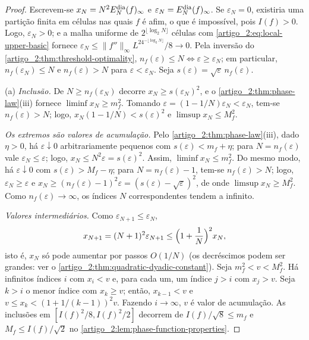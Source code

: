 \begin{proof}
Escrevem-se $x_N=N^2E_N^{\rm dia}(f)_\infty$ e $\varepsilon_N=E_N^{\rm dia}(f)_\infty$.
Se $\varepsilon_N=0$, existiria uma partição finita em células nas quais $f$ é afim,
o que é impossível, pois $I(f)>0$. Logo, $\varepsilon_N>0$; e a malha uniforme de $2^{\lfloor\log_2N\rfloor}$ células com
\eqref{artigo_2:eq:local-upper-basic} fornece
$\varepsilon_N\le\|f''\|_\infty L^24^{-\lfloor\log_2N\rfloor}/8\to0$.
Pela inversão do \cref{artigo_2:thm:threshold-optimality},
$n_f(\varepsilon)\le N\iff\varepsilon\ge\varepsilon_N$; em particular,
$n_f(\varepsilon_N)\le N$ e $n_f(\varepsilon)>N$ para $\varepsilon<\varepsilon_N$.
Seja $s(\varepsilon)=\sqrt\varepsilon\,n_f(\varepsilon)$.

(a) \emph{Inclusão.} De $N\ge n_f(\varepsilon_N)$ decorre $x_N\ge s(\varepsilon_N)^2$, e
o \cref{artigo_2:thm:phase-law}(iii) fornece $\liminf x_N\ge m_f^2$. Tomando
$\varepsilon=(1-1/N)\varepsilon_N<\varepsilon_N$, tem-se $n_f(\varepsilon)>N$; logo,
$x_N(1-1/N)<s(\varepsilon)^2$ e $\limsup x_N\le M_f^2$.

\emph{Os extremos são valores de acumulação.} Pelo
\cref{artigo_2:thm:phase-law}(iii), dado $\eta>0$, há $\varepsilon\downarrow0$
arbitrariamente pequenos com $s(\varepsilon)<m_f+\eta$; para $N=n_f(\varepsilon)$ vale
$\varepsilon_N\le\varepsilon$; logo, $x_N\le N^2\varepsilon=s(\varepsilon)^2$.
Assim, $\liminf x_N\le m_f^2$. Do mesmo modo, há $\varepsilon\downarrow0$ com
$s(\varepsilon)>M_f-\eta$; para $N=n_f(\varepsilon)-1$, tem-se $n_f(\varepsilon)>N$;
logo, $\varepsilon_N\ge\varepsilon$ e $x_N\ge(n_f(\varepsilon)-1)^2\varepsilon=(s(\varepsilon)-\sqrt\varepsilon)^2$,
de onde $\limsup x_N\ge M_f^2$. Como $n_f(\varepsilon)\to\infty$, os índices $N$
correspondentes tendem a infinito.

\emph{Valores intermediários.} Como $\varepsilon_{N+1}\le\varepsilon_N$,
\[
 x_{N+1}=(N+1)^2\varepsilon_{N+1}\le\Bigl(1+\frac1N\Bigr)^2x_N,
\]
isto é, $x_N$ só pode aumentar por passos $O(1/N)$ (os decréscimos podem ser
grandes: ver o \cref{artigo_2:thm:quadratic-dyadic-constant}). Seja
$m_f^2<v<M_f^2$. Há infinitos índices $i$ com $x_i<v$ e, para cada um, um
índice $j>i$ com $x_j>v$. Seja $k>i$ o menor índice com $x_k\ge v$; então,
$x_{k-1}<v$ e $v\le x_k<(1+1/(k-1))^2v$. Fazendo $i\to\infty$, $v$ é valor de
acumulação. As inclusões em $[I(f)^2/8,I(f)^2/2]$ decorrem de
$I(f)/\sqrt8\le m_f$ e $M_f\le I(f)/\sqrt2$ no
\cref{artigo_2:lem:phase-function-properties}.


\end{proof}
